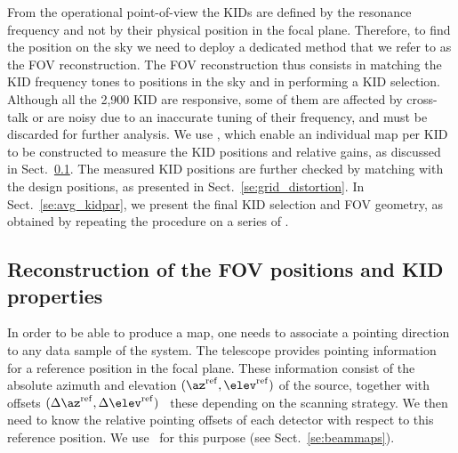 
{\lp From the operational point-of-view the KIDs are defined by the
resonance frequency and not by their physical position in the focal
plane. Therefore, to find the position on the sky we need to deploy
a dedicated method that we refer to as the FOV reconstruction.}
The FOV reconstruction thus consists in matching the KID frequency tones
to positions in the sky and in performing a KID selection.
Although all the 2,900 KID are responsive, some of them are affected by
cross-talk or are noisy due to an inaccurate tuning of their
frequency, and must be discarded for further analysis. We use \bms,
which enable an individual map per KID to be constructed %
to measure the KID positions and relative gains, as
discussed in Sect.~\ref{se:fov_geometry}. The measured KID positions
are further
checked by matching with the design positions, as presented in
Sect.~\ref{se:grid_distortion}. In Sect.~\ref{se:avg_kidpar}, we
present the final KID selection and FOV geometry, as obtained by
repeating the procedure on a series of \bms.  



\subsection{Reconstruction of the FOV positions and KID properties}
\label{se:fov_geometry}

In order to be able to produce a map, one needs to associate a pointing
direction to any data sample of the system. The telescope provides
pointing information for a reference position in the focal
plane. These information consist of the
absolute azimuth and elevation $(\az^{\rm{ref}},\elev^{\rm{ref}})$
of the source, together with offsets
$(\Delta\az^{\rm{ref}}, \Delta\elev^{\rm{ref}})$ \wrt~these {\lp
depending on the scanning strategy.}
We then need to know the relative pointing offsets of each detector
with respect to this reference position. We use
\bms\ for this purpose (see Sect.~\ref{se:beammaps}).

